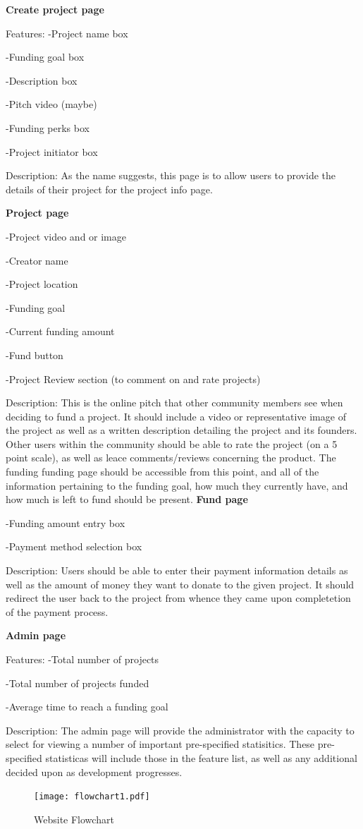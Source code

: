 \documentclass[12pt]{article}
\begin{document}
\begin{enumerate}
\textbf{Create project page}

Features:
-Project name box

-Funding goal box

-Description box

-Pitch video (maybe)

-Funding perks box

-Project initiator  box

Description:
As the name suggests, this page is to allow users to provide the details of their project for the project info page.

\textbf{Project page}

-Project video and or image

-Creator name

-Project location

-Funding goal

-Current funding amount

-Fund button

-Project Review section (to comment on and rate projects)

Description:
This is the online pitch that other community members see when deciding to fund a project.
It should include a video or representative image of the project as well as a written description detailing the 
project and its founders.
Other users within the community should be able to rate the project (on a 5 point scale), as well as leace comments/reviews
concerning the product. The funding funding page should be accessible from this point, and all of the information pertaining
to the funding goal, how much they currently have, and how much is left to fund should be present.
\textbf{Fund page}

-Funding amount entry box

-Payment method selection box

Description:
Users should be able to enter their payment information details as well as the amount of money they want to donate to
the given project.
It should redirect the user back to the project from whence they came upon completetion of the payment process.

\textbf{Admin page}

Features:
-Total number of projects

-Total number of projects funded

-Average time to reach a funding goal

Description:
The admin page will provide the administrator with the capacity to select for viewing a number of important pre-specified statisitics.
These pre-specified statisticas will include those in the feature list, as well as any additional decided upon as development progresses.
\begin{figure}[ht!]
\centering
\texttt{[image: flowchart1.pdf]}
\caption{Website Flowchart \label{overflow}}
\end{figure}



\end{enumerate}
\end{document}
